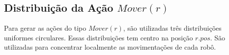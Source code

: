 \subsection{Distribuição da Ação $Mover(r)$}\label{subsec:distr_mov}

Para gerar as ações do tipo $Mover(r)$, são utilizadas três distribuições
uniformes circulares. Essas distribuições tem centro na posição $r.pos$.
São utilizadas para concentrar localmente as movimentações de cada robô.

